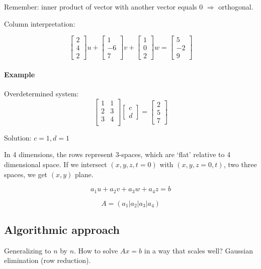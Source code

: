Remember: inner product of vector with another vector equals 0 $\Rightarrow$ orthogonal.

Column interpretation:

\[
	\begin{bmatrix}
		2 \\ 4 \\ 2
	\end{bmatrix} u + 
	\begin{bmatrix}
		1 \\ -6 \\ 7
	\end{bmatrix} v + 
	\begin{bmatrix}
		1 \\ 0 \\ 2
	\end{bmatrix} w =
	\begin{bmatrix}
		5 \\ -2 \\ 9
	\end{bmatrix}
\]

\paragraph{Example} Overdetermined system:
\[
	\begin{bmatrix}
		1 & 1 \\
		2 & 3 \\
		3 & 4 \\
	\end{bmatrix}
	\begin{bmatrix}
		c \\ d
	\end{bmatrix} = 
	\begin{bmatrix}
		2 \\ 5 \\ 7
	\end{bmatrix}
\]

Solution: $c = 1, d = 1$

In 4 dimensions, the rows represent 3-spaces, which are `flat' relative to 4 dimensional space. If we intersect $(x,y,z,t=0)$ with $(x,y,z=0,t)$, two three spaces, we get $(x,y)$ plane.

\[
	a_1 u + a_2 v + a_3 w + a_4 z = b
\]

\[
	A = (a_1 | a_2 | a_3 | a_4)
\]

\subsection{Algorithmic approach}
Generalizing to $n$ by $n$. How to solve $Ax = b$ in a way that scales well? Gaussian elimination (row reduction).


